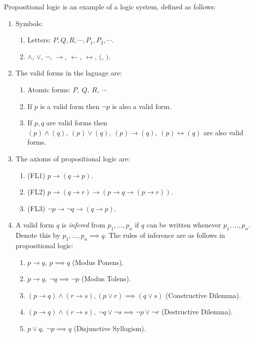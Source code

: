 \begin{example}\label{def:prologic}
  Propositional logic is an example of a logic system, defined as follows:
  \begin{enumerate}
    \item Symbols: 
      \begin{enumerate}
        \item Letters: $P,Q,R,\cdots, P_1, P_2, \cdots$.
        \item $\land$, $\lor$, $\lnot$, $\to$, $\leftarrow$, $\leftrightarrow$, $($, $)$.
      \end{enumerate}
    \item The valid forms in the laguage are:
      \begin{enumerate}
         \item Atomic forms: $P,\ Q,\ R,\ \cdots$
         \item If $p$ is a valid form then $\lnot p$ is also a valid form.
         \item If $p,q$ are valid forms then $(p)\land (q),\ (p)\lor (q),\ (p)\to (q),\ (p)\leftrightarrow (q)$ are also valid forms.
      \end{enumerate}
    \item The axioms of propositional logic are:
      \begin{enumerate}
         \item (FL1) $p\to (q\to p)$.
         \item (FL2) $p\to (q\to r) \to (p\to q \to (p\to r))$.
         \item (FL3) $\lnot p \to \lnot q \to (q\to p)$.
      \end{enumerate}
    \item A valid form $q$ is \textit{infered} from $p_1,...,p_n$ if $q$ can be written whenever $p_1,...,p_n$. Denote this by $p_1,...,p_n \implies q$. The rules of inference are as follows in propositional logic:
      \begin{enumerate}
        \item $p\to q,\ p \implies q$ (Modus Ponens).
        \item $p\to q,\ \lnot q \implies \lnot p$ (Modus Tolens).
        \item $(p\to q)\land (r\to s), (p\lor r) \implies (q\lor s)$ (Constructive Dilemma).
        \item $(p\to q)\land (r\to s),\ \lnot q \lor \lnot s\implies \lnot p \lor \lnot r$ (Destructive Dilemma).
        \item $p\lor q,\ \lnot p\implies q$ (Disjunctive Syllogism).

\end{enumerate}
\end{enumerate}
\end{example}

